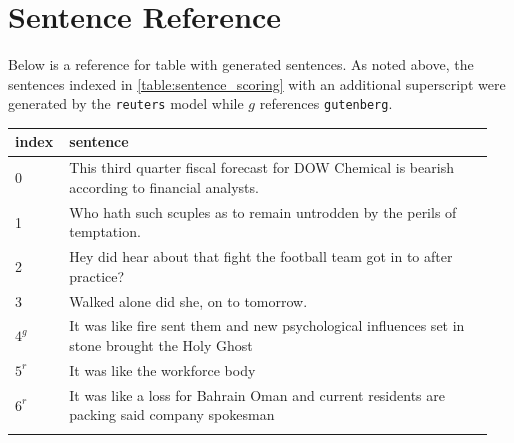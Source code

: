 \documentclass[11pt,a4paper]{article}
\begin{document}
\appendix

\section{Sentence Reference}%
\label{sec:sentence_ref}

Below is a reference for table with generated sentences. As noted above, the sentences indexed in \ref{table:sentence_scoring} with an additional superscript were generated by the \texttt{reuters} model while $g$ references \texttt{gutenberg}.

\vspace{4mm}
\begin{tabular}{p{0.1\linewidth}|p{0.85\linewidth}}
\hline
   index & sentence                                                                                        \\
\hline
       0 & This third quarter fiscal forecast for DOW Chemical is bearish according to financial analysts. \\
       1 & Who hath such scuples as to remain untrodden by the perils of temptation.                       \\
       2 & Hey did hear about that fight the football team got in to after practice?                       \\
       3 & Walked alone did she, on to tomorrow.                                                           \\
       $4^g$ & It was like fire sent them and new psychological influences set in stone brought the Holy Ghost \\
       $5^r$ & It was like the workforce body                                                                  \\
       $6^r$ & It was like a loss for Bahrain Oman and current residents are packing said company spokesman    \\
\hline
\label{table:sentence_reference}
\end{tabular}
\end{document}
